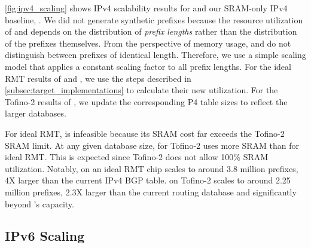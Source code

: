 \cref{fig:ipv4_scaling} shows IPv4 scalability results for \resail and our SRAM-only IPv4 baseline, \sail. We did not generate synthetic prefixes because the resource utilization of \resail and \sail depends on the distribution of {\em prefix lengths} rather than the distribution of the prefixes themselves. From the perspective of memory usage, \resail and \sail do not distinguish between prefixes of identical length. Therefore, we use a simple scaling model that applies a constant scaling factor to all prefix lengths. For the ideal RMT results of \resail and \sail, we use the steps described in \cref{subsec:target_implementations} to calculate their new utilization. For the Tofino-2 results of \resail, we update the corresponding P4 table sizes to reflect the larger databases.

For ideal RMT, \sail is infeasible because its SRAM cost far exceeds the Tofino-2 SRAM limit. At any given database size, \resail for Tofino-2 uses more SRAM than \resail for ideal RMT. This is expected since Tofino-2 does not allow 100\% SRAM utilization. Notably, \resail on an ideal RMT chip scales to around 3.8 million prefixes, 4X larger than the current IPv4 BGP table. \resail on Tofino-2 scales to around 2.25 million prefixes, 2.3X larger than the current routing database and significantly beyond \sail's capacity.

\subsection{IPv6 Scaling} \label{subsec:ipv6_scaling}

